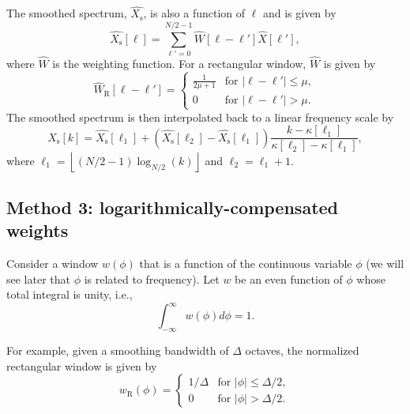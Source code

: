 The smoothed spectrum, $\hat{X_\textrm{s}}$, is also a function of $\ell$ and is given by
\begin{equation}
\hat{X_\textrm{s}}[\ell] = \sum_{\ell' = 0}^{N/2 - 1} \hat{W}[\ell - \ell'] \hat{X}[\ell'],
\end{equation}
where $\hat{W}$ is the weighting function.
For a rectangular window, $\hat{W}$ is given by
\begin{equation}
\hat{W}_{\textrm{R}}[\ell - \ell'] = \left\{
    \begin{array}{cl}
	\displaystyle \frac{1}{2 \mu + 1} & \textrm{for } \left| \ell - \ell' \right| \leq \mu,\\[8pt]
	0 & \textrm{for } \left| \ell - \ell' \right| > \mu.
    \end{array}\right.
\end{equation}
The smoothed spectrum is then interpolated back to a linear frequency scale by
\begin{equation}
X_\textrm{s}[k] = \hat{X_\textrm{s}}[\ell_1] + \left( \hat{X_\textrm{s}}[\ell_2] - \hat{X_\textrm{s}}[\ell_1] \right) \frac{k - \kappa[\ell_1]}{\kappa[\ell_2] - \kappa[\ell_1]},
\end{equation}
where $\ell_1 = \left\lfloor (N/2 - 1) \log_{N/2} (k) \right\rfloor$ and $\ell_2 = \ell_1 + 1$.

\subsection{Method 3: logarithmically-compensated weights} \label{sec:A3_Smoothing_Weights:Smoothing_Methods:Proposed_Method}
Consider a window $w(\phi)$ that is a function of the continuous variable $\phi$ (we will see later that $\phi$ is related to frequency).
Let $w$ be an even function of $\phi$ whose total integral is unity, i.e.,
\begin{equation}\label{eq:A3_Smoothing_Weights:WindowNorm}
\int_{-\infty}^{\infty} w(\phi) d\phi = 1.
\end{equation}

For example, given a smoothing bandwidth of $\Delta$ octaves, the normalized rectangular window is given by
\begin{equation}\label{eq:A3_Smoothing_Weights:RectangularWindowLogf}
w_\textrm{R}(\phi) = \left\{
    \begin{array}{cl}
	1/\Delta & \textrm{for } |\phi| \leq \Delta/2,\\[8pt]
	0 & \textrm{for } |\phi| > \Delta/2.
    \end{array}\right.
\end{equation}

